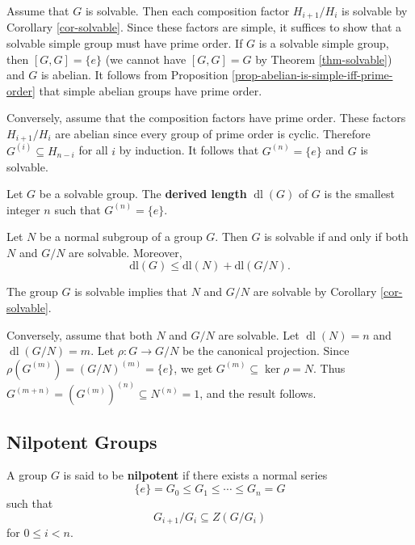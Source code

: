 \begin{sketch}
	Assume that $G$ is solvable. Then each composition factor $H_{i+1}/H_i$ is solvable by Corollary \ref{cor-solvable}. Since these factors are simple, it suffices to show that a solvable simple group must have prime order. If $G$ is a solvable simple group, then $[G,G] =\{e\}$ (we cannot have $[G,G] = G$ by Theorem \ref{thm-solvable}) and $G$ is abelian. It follows from Proposition \ref{prop-abelian-is-simple-iff-prime-order} that simple abelian groups have prime order. 
	
	
Conversely, assume that the composition factors have prime order. These factors $H_{i+1}/H_i$ are abelian since every group of prime order is cyclic.  Therefore $G^{(i)} \subseteq H_{n-i}$ for all $i$ by induction.  It follows that $G^{(n)} = \{e\}$ and $G$ is solvable.
\end{sketch} 
\begin{definition}
	Let $G$ be a  solvable group. The \textbf{derived length} $\operatorname{dl}(G)$ of $G$ is the smallest integer $n$ such that $G^{(n)} = \{e\}$.
\end{definition}
\begin{corollary}
	Let $N$ be a normal subgroup of  a group $G$. Then $G$ is solvable if and only if both $N$ and $G/N$ are solvable. Moreover, $$\text{dl}(G) \leq \text{dl}(N) + \text{dl}(G/N).$$
\end{corollary}
\begin{sketch}
	 The group $G$ is solvable implies that $N$ and $G/N$ are solvable by Corollary \ref{cor-solvable}.
	 
	 Conversely, assume that both $N$ and $G/N$ are solvable. Let $\operatorname{dl}(N) = n$ and $\operatorname{dl}(G/N) = m$. Let  $\rho:G \rightarrow G/N$ be the canonical projection. Since $\rho(G^{(m)}) = (G/N)^{(m)} = \{e\}$, we get $G^{(m)} \subseteq \ker \rho = N$. Thus $G^{(m+n)} = (G^{(m)})^{(n)} \subseteq N^{(n)} = 1$, and the result follows.
\end{sketch}





\subsection{Nilpotent Groups}
\begin{definition}
	A group $G$ is said to be \textbf{nilpotent} if there exists a normal series
	\begin{equation*}
		\{e\} = G_0 \leq G_1 \leq \cdots \leq G_n = G
	\end{equation*}
	such that
	\begin{equation*}
		G_{i+1}/G_{i} \subseteq Z(G/G_{i})
	\end{equation*}
	for $0\leq i<n$.
\end{definition}

